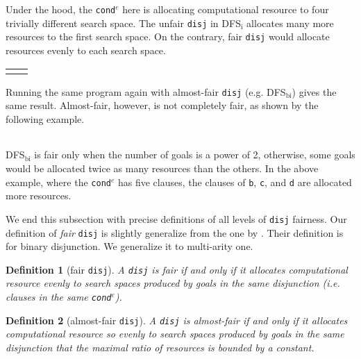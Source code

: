 \documentclass[format=acmlarge, review=true, authordraft=true]{acmart}
\newcommand{\conde}{\texttt{cond$^e$}}
\newcommand{\disj}{\texttt{disj}}
\newcommand{\DFSi }[0]{DFS$_\textrm{i}$}
\newcommand{\DFSbi}[0]{DFS$_\textrm{bi}$}
\newtheorem{defn}{Definition}[section]
\begin{document}
\begin{center}
	\begin{tabular}{c}
		
	\end{tabular}
\end{center}

Under the hood, the \conde{} here is allocating computational resource to 
four trivially different search space. The unfair \disj{} in 
\DFSi{} allocates many more resources to the first search space. On the 
contrary, fair \disj{} would allocate resources evenly to each search space. 

\begin{center}
	\begin{tabular}{l|r}
		 &
		
	\end{tabular}
\end{center}

Running the same program again with almost-fair \disj {} (e.g. 
DFS$_\textrm{bi}$) gives the same result. Almost-fair, however, is not 
completely fair, as shown by the following example. 

\begin{center}
	\begin{tabular}{c}
		
	\end{tabular}
\end{center}

\DFSbi{} is fair only when the number of goals is a power of 2, 
otherwise, some goals would be allocated twice as many resources than the 
others. In the above example, where the \conde{} has five clauses, the clauses 
of \texttt{b}, \texttt{c}, and \texttt{d} are allocated more resources.

We end this subsection with precise definitions of all levels of 
\disj{} fairness. Our definition of \emph{fair} \disj{} is slightly generalize 
from the one by \citet{seres1999algebra}. Their definition is for binary 
disjunction. We generalize it to multi-arity one.

\begin{defn}[fair \disj{}]
A \disj{} is fair if and only if it allocates computational resource evenly to 
search spaces produced by goals in the same disjunction (i.e. clauses in 
the same \conde).
\end{defn}

\begin{defn}[almost-fair \disj{}]
A \disj{} is almost-fair if and only if it allocates computational resource so 
evenly to 
search spaces produced by goals in the same disjunction that the maximal ratio 
of resources is bounded by a constant.
\end{defn}
\end{document}
